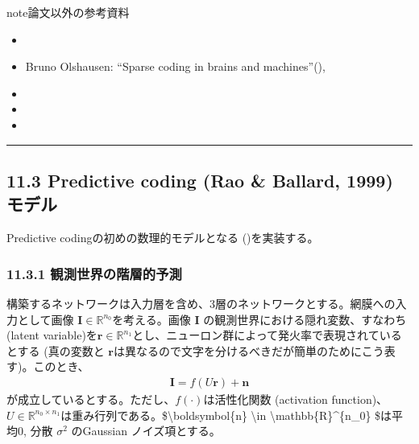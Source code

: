 \documentclass[letterpaper,10pt,english]{sphinxmanual}
\begin{document}
\begin{sphinxadmonition}{note}{論文以外の参考資料}
\begin{itemize}
\item {} 

\item {} 
Bruno Olshausen: “Sparse coding in brains and machines”(), 

\item {} 

\item {} 

\item {} 

\end{itemize}
\end{sphinxadmonition}


\bigskip\hrule\bigskip



\subsection{11.3 Predictive coding (Rao \& Ballard, 1999) モデル}
\label{\detokenize{11-3_predictive-coding-rao:predictive-coding-rao-ballard-1999}}\label{\detokenize{11-3_predictive-coding-rao::doc}}
Predictive codingの初めの数理的モデルとなる ()を実装する。


\subsubsection{11.3.1 観測世界の階層的予測}
\label{\detokenize{11-3_predictive-coding-rao:id1}}
構築するネットワークは入力層を含め、3層のネットワークとする。網膜への入力として画像 \(\boldsymbol{I} \in \mathbb{R}^{n_0}\)を考える。画像 \(\boldsymbol{I}\) の観測世界における隠れ変数、すなわち (latent variable)を\(\boldsymbol{r} \in \mathbb{R}^{n_1}\)とし、ニューロン群によって発火率で表現されているとする (真の変数と \(\boldsymbol{r}\)は異なるので文字を分けるべきだが簡単のためにこう表す)。このとき、
\begin{equation*}
\begin{split}
\boldsymbol{I} = f(U\boldsymbol{r}) + \boldsymbol{n} \tag{1}
\end{split}
\end{equation*}
が成立しているとする。ただし、\(f(\cdot)\)は活性化関数 (activation function)、\(U \in \mathbb{R}^{n_0 \times n_1}\)は重み行列である。\$\textbackslash{}boldsymbol\{n\} \textbackslash{}in \textbackslash{}mathbb\{R\}\textasciicircum{}\{n\_0\} \$は平均0, 分散 \(\sigma^2\) のGaussian ノイズ項とする。
\end{document}
